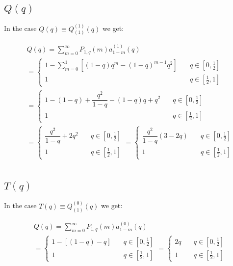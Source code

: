 \documentclass[letterpaper,12pt]{report}
\theoremstyle{plain}
\theoremstyle{definition}
\begin{document}
\subsection{$\mathit{Q}(q)$}\label{app:qofq}
In the case $\mathit{Q}(q)\equiv\mathit{Q_{(1)}^{(1)}}(q)$ we get:

\begin{eqnarray}\label{eq:qnspecific}\nonumber
&\mathit{Q}(q)=\sum_{m=0}^{\infty}\mathit{P}_{1,q}(m)\mathit{a}^{(1)}_{1-m}(q)\\ \nonumber
&=
\begin{cases}
1-\sum_{m=0}^1\left[(1-q)q^m-(1-q)^{m-1}q^2\right] & \quad q \in [0,\frac{1}{2}] \\
1 & \quad q \in [\frac{1}{2},1] 
\end{cases} \\ \nonumber
&=
\begin{cases}
1-(1-q)+\dfrac{q^2}{1-q}-(1-q)q+q^2 & \quad q \in [0,\frac{1}{2}] \\
1 & \quad q \in [\frac{1}{2},1] 
\end{cases} \\ \nonumber
&=
\begin{cases}
\dfrac{q^2}{1-q}+2q^2 & \quad q \in [0,\frac{1}{2}] \\
1 & \quad q \in [\frac{1}{2},1] 
\end{cases} =
\begin{cases}
\dfrac{q^2}{1-q}\left(3-2q\right) & \quad q \in [0,\frac{1}{2}] \\
1 & \quad q \in [\frac{1}{2},1] 
\end{cases} \\ \nonumber
\end{eqnarray}

\subsection{$\mathit{T}(q)$}\label{app:tofq}
In the case $\mathit{T}(q)\equiv\mathit{Q_{(1)}^{(0)}}(q)$ we get:

\begin{eqnarray}\label{eq:qnspecific}\nonumber
&\mathit{Q}(q)=\sum_{m=0}^{\infty}\mathit{P}_{1,q}(m)\mathit{a}^{(0)}_{1-m}(q)\\ \nonumber
&=
\begin{cases}
1-\left[(1-q)-q\right] & \quad q \in [0,\frac{1}{2}] \\
1 & \quad q \in [\frac{1}{2},1] 
\end{cases} =
\begin{cases}
2q & \quad q \in [0,\frac{1}{2}] \\
1 & \quad q \in [\frac{1}{2},1] 
\end{cases} \\ \nonumber
\end{eqnarray}



\newpage

\end{document}
